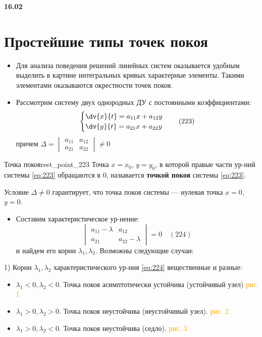 \noindent \textbf{16.02}

\section{Простейшие типы точек покоя}

\begin{itemize}
	\item Для анализа поведения решений линейных систем оказывается удобным выделить в картине интегральных кривых характерные элементы. Такими элементами оказываются окрестности точек покоя.
	
	\item Рассмотрим систему двух однородных ДУ с постоянными коэффициентами:
	\begin{equation} \label{eq:223}
		\begin{cases}
			\dv{x}{t} = a_{11}x + a_{12}y \\
			\dv{y}{t} = a_{21}x + a_{22}y
		\end{cases} \quad (223)
	\end{equation}
	причем $\Delta = \begin{vmatrix} a_{11} & a_{12} \\ a_{21} & a_{22} \end{vmatrix} \neq 0$
\end{itemize}

\begin{definition}{Точка покоя}{rest_point_223}
	Точка $x=x_0$, $y=y_0$, в которой правые части ур-ний системы \eqref{eq:223} обращаются в $0$, называется \textbf{точкой покоя} системы \eqref{eq:223}.
\end{definition}

Условие $\Delta \neq 0$ гарантирует, что точка покоя системы --- нулевая точка $x=0$, $y=0$.

\begin{itemize}
	\item Составим характеристическое ур-нение: 
	\begin{equation} \label{eq:224}
		\begin{vmatrix} a_{11} - \lambda & a_{12} \\ a_{21} & a_{22} - \lambda \end{vmatrix} = 0 \quad (224)
	\end{equation}
	и найдем его корни $\lambda_1, \lambda_2$. Возможны следующие случаи:
\end{itemize}

1) Корни $\lambda_1, \lambda_2$ характеристического ур-ния \eqref{eq:224} вещественные и разные:
\begin{itemize}
	\item[(а)] $\lambda_1 < 0, \lambda_2 < 0$. Точка покоя асимптотически устойчива (устойчивый узел) \textcolor{orange}{рис. 1}
	\item[(б)] $\lambda_1 > 0, \lambda_2 > 0$. Точка покоя неустойчива (неустойчивый узел). \textcolor{orange}{рис. 2}
	\item[(в)] $\lambda_1 > 0, \lambda_2 < 0$. Точка покоя неустойчива (седло). \textcolor{orange}{рис. 3}
\end{itemize}

